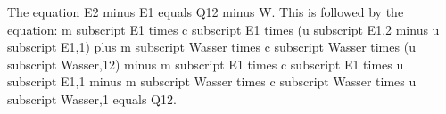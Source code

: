 The equation E2 minus E1 equals Q12 minus W. This is followed by the equation: m subscript E1 times c subscript E1 times (u subscript E1,2 minus u subscript E1,1) plus m subscript Wasser times c subscript Wasser times (u subscript Wasser,12) minus m subscript E1 times c subscript E1 times u subscript E1,1 minus m subscript Wasser times c subscript Wasser times u subscript Wasser,1 equals Q12.